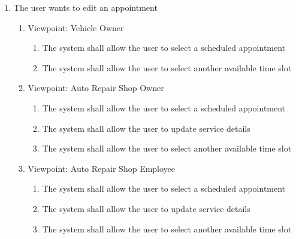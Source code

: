 \documentclass[12pt]{article}
\begin{document}
\begin{enumerate}[resume*=business_events]
	\item The user wants to edit an appointment
	      \begin{enumerate}[VP\arabic*.]
		      \item Viewpoint: Vehicle Owner
		            \begin{enumerate}
			            \item The system shall allow the user to select a scheduled appointment
			            \item The system shall allow the user to select another available time slot
		            \end{enumerate}
		      \item Viewpoint: Auto Repair Shop Owner
		            \begin{enumerate}
			            \item The system shall allow the user to select a scheduled appointment
			            \item The system shall allow the user to update service details
			            \item The system shall allow the user to select another available time slot
		            \end{enumerate}
		      \item Viewpoint: Auto Repair Shop Employee
		            \begin{enumerate}
			            \item The system shall allow the user to select a scheduled appointment
			            \item The system shall allow the user to update service details
			            \item The system shall allow the user to select another available time slot
		            \end{enumerate}
	      \end{enumerate}


\end{enumerate}
\end{document}
